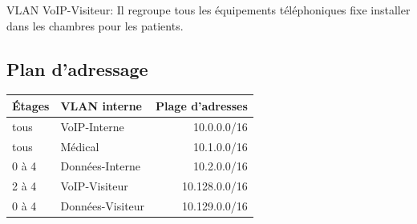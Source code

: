 VLAN VoIP-Visiteur:
Il regroupe  tous les équipements téléphoniques fixe installer dans les chambres pour les patients.



%
%
\subsection{Plan d'adressage}

    \begin{center}
        \begin{tabular}{|l|l|r|}
          \hline
            Étages  &   VLAN interne    &   Plage d'adresses \\
          \hline
            tous    &   VoIP-Interne    &   10.0.0.0/16 \\
          \hline
            tous    &   Médical         &   10.1.0.0/16 \\
          \hline
            0 à 4   &   Données-Interne &   10.2.0.0/16 \\
          \hline
            2 à 4   &   VoIP-Visiteur   &   10.128.0.0/16 \\
          \hline
            0 à 4   &  Données-Visiteur &   10.129.0.0/16 \\
          \hline
        \end{tabular}
    \end{center}

%
%
